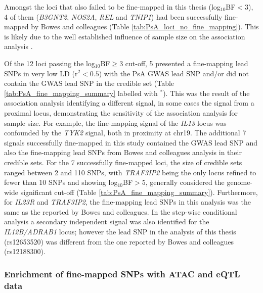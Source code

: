Amongst the loci that also failed to be fine-mapped in this thesis (log$_{10}$BF$<$3), 4 of them (\textit{B3GNT2}, \textit{NOS2A}, \textit{REL} and \textit{TNIP1}) had been successfully fine-mapped by Bowes and colleagues (Table \ref{tab:PsA_loci_no_fine_mapping}). This is likely due to the well established influence of sample size on the association analysis \parencite{Bunt2015}. %


Of the 12 loci passing the log$_{10}$BF$\geq$3 cut-off, 5 presented a fine-mapping lead SNPs in very low LD (r${^2}<0.5$) with the PsA GWAS lead SNP and/or did not contain the GWAS lead SNP in the credible set (Table \ref{tab:PsA_fine_mapping_summary} labelled with $^{\ast}$). This was the result of the association analysis identifying a different signal, in some cases the signal from a proximal locus, demonstrating the sensitivity of the association analysis for sample size. For example, the fine-mapping signal of the \textit{IL13} locus was confounded by the \textit{TYK2} signal, both in proximity at chr19. The additional 7 signals successfully fine-mapped in this study contained the GWAS lead SNP and also the fine-mapping lead SNPs from Bowes and colleagues analysis in their credible sets. For the 7 successfully fine-mapped loci, the size of credible sets ranged between 2 and 110 SNPs, with \textit{TRAF3IP2} being the only locus refined to fewer than 10 SNPs and showing log$_{10}$BF$>$5, generally considered the genome-wide significant cut-off (Table \ref{tab:PsA_fine_mapping_summary}). Furthermore, for \textit{IL23R} and \textit{TRAF3IP2}, the fine-mapping lead SNPs in this analysis was the same as the reported by Bowes and colleagues. In the step-wise conditional analysis a secondary independent signal was also identified for the \textit{IL12B/ADRAB1} locus; however the lead SNP in the analysis of this thesis (rs12653520) was different from the one reported by Bowes and colleagues (rs12188300). 




\subsubsection{Enrichment of fine-mapped SNPs with ATAC and eQTL data}

